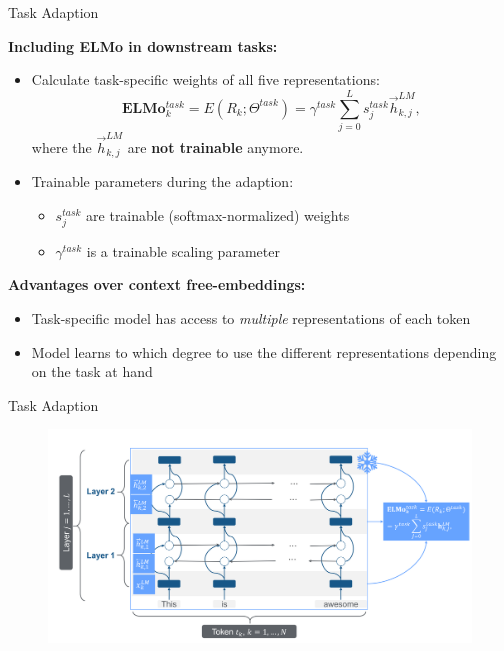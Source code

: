 
\begin{vbframe}{Task Adaption}

\vfill

\textbf{Including ELMo in downstream tasks:}

	\begin{itemize}
		\item Calculate task-specific weights of all five representations:
					$$\mathbf{E} \mathbf{L} \mathbf{M} \mathbf{o}_{k}^{t a s k}=E\left(R_{k} ; \Theta^{t a s k}\right)=\gamma^{t a s k} \sum_{j=0}^{L} s_{j}^{t a s k} \vec h_{k, j}^{L M},$$
					where the $\vec h_{k, j}^{L M}$ are \textbf{not trainable} anymore.
		\item Trainable parameters during the adaption:
			\begin{itemize}
				\item $s_{j}^{t a s k}$ are trainable (softmax-normalized) weights
				\item $\gamma^{t a s k}$ is a trainable scaling parameter
			\end{itemize}
	\end{itemize}

	\textbf{Advantages over context free-embeddings:}

	\begin{itemize}
		\item Task-specific model has access to \textit{multiple} representations of each token
		\item Model learns to which degree to use the different representations depending on the task at hand
	\end{itemize}

\vfill

\end{vbframe}


\begin{vbframe}{Task Adaption}

\vfill

	\begin{figure}
		\centering
		\includegraphics[width = 12cm]{figure/elmo-adaption}\\ 
	\end{figure}

\vfill

\end{vbframe}

